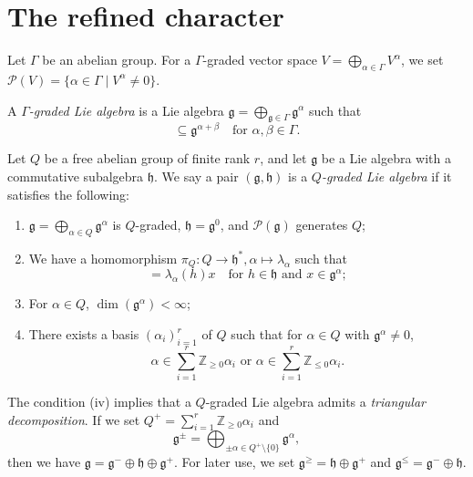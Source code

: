 \documentclass[a4paper, 12pt, reqno]{amsart}
\begin{document}
\section{The refined character}
\label{sec:refined-character}

Let $\Gamma$ be an abelian group.
For a $\Gamma$-graded vector space $V = \bigoplus_{\alpha \in \Gamma}V^{\alpha}$, we set $\mathcal{P}(V) = \{\alpha \in \Gamma \mid V^{\alpha} \neq 0\}$.

A \emph{$\Gamma$-graded Lie algebra} is a Lie algebra $\mathfrak{g} = \bigoplus_{\mathfrak{g} \in \Gamma}\mathfrak{g}^{\alpha}$ such that
\begin{equation*}
  [\mathfrak{g}^{\alpha}, \mathfrak{g}^{\beta}] \subseteq \mathfrak{g}^{\alpha + \beta} \quad \text{for $\alpha, \beta \in \Gamma$}.
\end{equation*}

Let $Q$ be a free abelian group of finite rank $r$, and let $\mathfrak{g}$ be a Lie algebra with a commutative subalgebra $\mathfrak{h}$.
We say a pair $(\mathfrak{g}, \mathfrak{h})$ is a \emph{$Q$-graded Lie algebra} if it satisfies the following:
\begin{enumerate}
\item $\mathfrak{g} = \bigoplus_{\alpha \in Q}\mathfrak{g}^{\alpha}$ is $Q$-graded, $\mathfrak{h} = \mathfrak{g}^0$, and $\mathcal{P}(\mathfrak{g})$ generates $Q$;
\item We have a homomorphism $\pi_Q: Q \to \mathfrak{h}^*, \alpha \mapsto \lambda_{\alpha}$ such  that
  \begin{equation*}
    [h, x] = \lambda_{\alpha}(h)x \quad \text{for $h \in \mathfrak{h}$ and $x \in \mathfrak{g}^{\alpha}$};
  \end{equation*}
\item For $\alpha \in Q$, $\dim(\mathfrak{g}^{\alpha}) < \infty$;
\item There exists a basis $(\alpha_i)_{i = 1}^r$ of $Q$ such that for $\alpha \in Q$ with $\mathfrak{g}^{\alpha} \neq 0$,
  \begin{equation*}
    \text{$\alpha \in \sum_{i = 1}^r\mathbb{Z}_{\ge 0}\alpha_i$ or $\alpha \in \sum_{i = 1}^r\mathbb{Z}_{\le 0}\alpha_i$}.
  \end{equation*}
\end{enumerate}

The condition (iv) implies that a $Q$-graded Lie algebra admits a \emph{triangular decomposition}.
  If we set $Q^+ = \sum_{i = 1}^r\mathbb{Z}_{\ge 0}\alpha_i$ and
  \begin{equation*}
    \mathfrak{g}^{\pm} = \bigoplus_{\pm \alpha \in Q^+ \setminus \{0\}}\mathfrak{g}^{\alpha},
  \end{equation*}
  then we have $\mathfrak{g} = \mathfrak{g}^- \oplus \mathfrak{h} \oplus \mathfrak{g}^+$.
  For later use, we set $\mathfrak{g}^{\ge} = \mathfrak{h} \oplus \mathfrak{g}^+$ and $\mathfrak{g}^{\le} = \mathfrak{g}^- \oplus \mathfrak{h}$.
\end{document}
